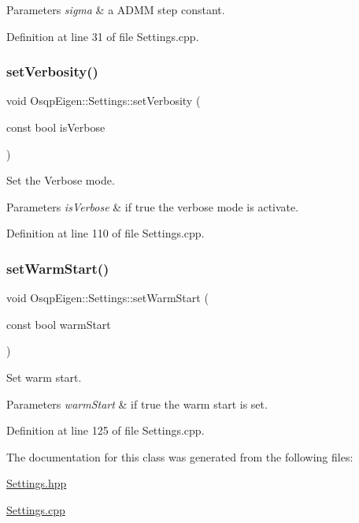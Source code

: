 \begin{DoxyParams}{Parameters}
{\em sigma} & a A\+D\+MM step constant. \\
\hline
\end{DoxyParams}


Definition at line 31 of file Settings.\+cpp.

\mbox{\label{classOsqpEigen_1_1Settings_ac44115458417ef2257bc5c49634b0749}} 
\subsubsection{\texorpdfstring{set\+Verbosity()}{setVerbosity()}}
{\footnotesize\ttfamily void Osqp\+Eigen\+::\+Settings\+::set\+Verbosity (\begin{DoxyParamCaption}\item[{const bool}]{is\+Verbose }\end{DoxyParamCaption})}



Set the Verbose mode. 


\begin{DoxyParams}{Parameters}
{\em is\+Verbose} & if true the verbose mode is activate. \\
\hline
\end{DoxyParams}


Definition at line 110 of file Settings.\+cpp.

\mbox{\label{classOsqpEigen_1_1Settings_a5a9e4b887938fd742f81067563d021a6}} 
\subsubsection{\texorpdfstring{set\+Warm\+Start()}{setWarmStart()}}
{\footnotesize\ttfamily void Osqp\+Eigen\+::\+Settings\+::set\+Warm\+Start (\begin{DoxyParamCaption}\item[{const bool}]{warm\+Start }\end{DoxyParamCaption})}



Set warm start. 


\begin{DoxyParams}{Parameters}
{\em warm\+Start} & if true the warm start is set. \\
\hline
\end{DoxyParams}


Definition at line 125 of file Settings.\+cpp.



The documentation for this class was generated from the following files\+:\begin{DoxyCompactItemize}
\item 
\mbox{\hyperlink{Settings_8hpp}{Settings.\+hpp}}\item 
\mbox{\hyperlink{Settings_8cpp}{Settings.\+cpp}}\end{DoxyCompactItemize}
